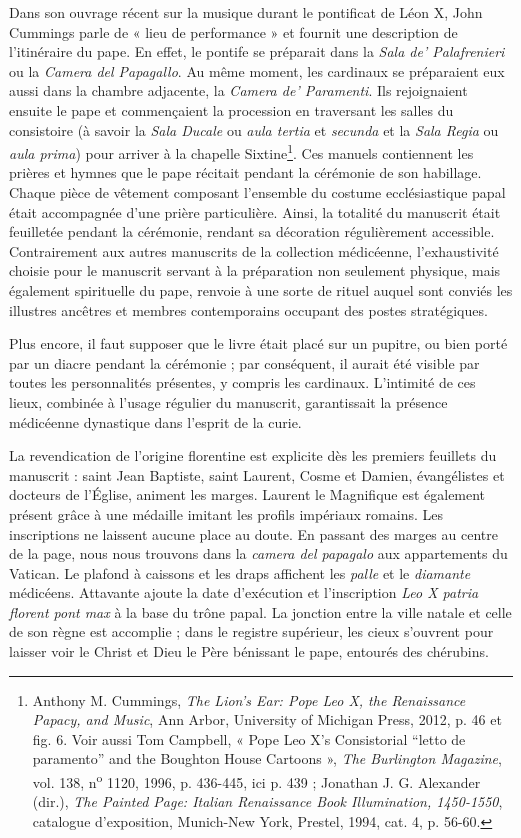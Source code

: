 \documentclass[12pt,twoside,openany]{book}
\begin{document}
Dans son ouvrage récent sur la musique durant le pontificat de Léon X, John Cummings parle de « lieu de performance » et fournit une description de l’itinéraire du pape. En effet, le pontife se préparait dans la \textit{Sala de’ Palafrenieri} ou la \textit{Camera del Papagallo}. Au même moment, les cardinaux se préparaient eux aussi dans la chambre adjacente, la \textit{Camera de’ Paramenti}. Ils rejoignaient ensuite le pape et commençaient la procession en traversant les salles du consistoire (à savoir la \textit{Sala Ducale} ou \textit{aula tertia} et \textit{secunda} et la \textit{Sala Regia} ou \textit{aula prima}) pour arriver à la chapelle Sixtine\footnote{Anthony M. Cummings, \textit{The Lion’s Ear: Pope Leo X, the Renaissance Papacy, and Music}, Ann Arbor, University of Michigan Press, 2012, p. 46 et fig. 6. Voir aussi Tom Campbell, « Pope Leo X’s Consistorial “letto de paramento” and the Boughton House Cartoons », \textit{The Burlington Magazine}, vol. 138, n\textsuperscript{o} 1120, 1996, p. 436-445, ici p. 439 ; Jonathan J. G. Alexander (dir.), \textit{The Painted Page: Italian Renaissance Book Illumination, 1450-1550}, catalogue d’exposition, Munich-New York, Prestel, 1994, cat. 4, p. 56-60.}. Ces manuels contiennent les prières et hymnes que le pape récitait pendant la cérémonie de son habillage. Chaque pièce de vêtement composant l’ensemble du costume ecclésiastique papal était accompagnée d’une prière particulière. Ainsi, la totalité du manuscrit était feuilletée pendant la cérémonie, rendant sa décoration régulièrement accessible. Contrairement aux autres manuscrits de la collection médicéenne, l’exhaustivité choisie pour le manuscrit servant à la préparation non seulement physique, mais également spirituelle du pape, renvoie à une sorte de rituel auquel sont conviés les illustres ancêtres et membres contemporains occupant des postes stratégiques.

Plus encore, il faut supposer que le livre était placé sur un pupitre, ou bien porté par un diacre pendant la cérémonie ; par conséquent, il aurait été visible par toutes les personnalités présentes, y compris les cardinaux. L’intimité de ces lieux, combinée à l’usage régulier du manuscrit, garantissait la présence médicéenne dynastique dans l’esprit de la curie.

La revendication de l’origine florentine est explicite dès les premiers feuillets du manuscrit : saint Jean Baptiste, saint Laurent, Cosme et Damien, évangélistes et docteurs de l’Église, animent les marges. Laurent le Magnifique est également présent grâce à une médaille imitant les profils impériaux romains. Les inscriptions ne laissent aucune place au doute. En passant des marges au centre de la page, nous nous trouvons dans la \textit{camera del papagalo} aux appartements du Vatican. Le plafond à caissons et les draps affichent les \textit{palle} et le \textit{diamante} médicéens. Attavante ajoute la date d’exécution et l’inscription \textit{Leo X patria florent pont max} à la base du trône papal. La jonction entre la ville natale et celle de son règne est accomplie ; dans le registre supérieur, les cieux s’ouvrent pour laisser voir le Christ et Dieu le Père bénissant le pape, entourés des chérubins.
\end{document}
